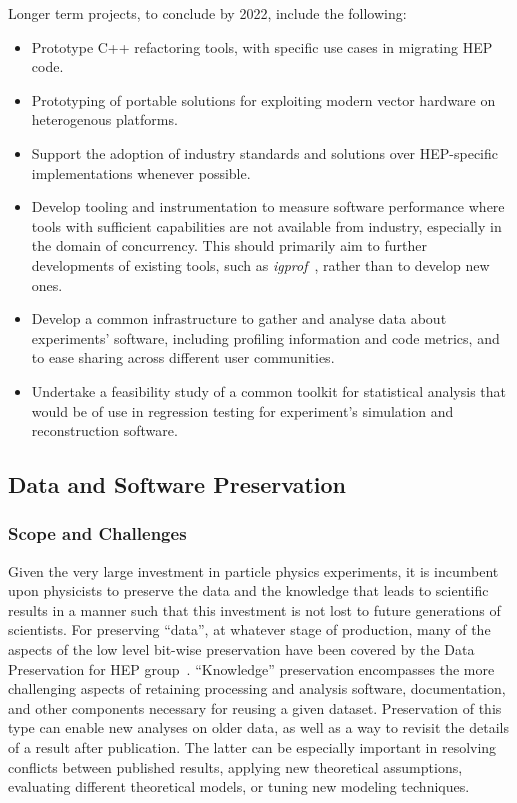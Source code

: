 Longer term projects, to conclude by 2022, include the following:

\begin{itemize}
\item
  Prototype C++ refactoring tools, with specific use cases in migrating
  HEP code.
\item
  Prototyping of portable solutions for exploiting modern vector
  hardware on heterogenous platforms.
\item
  Support the adoption of industry standards and solutions over
  HEP-specific implementations whenever possible.
\item
  Develop tooling and instrumentation to measure software performance
  where tools with sufficient capabilities are not available from
  industry, especially in the domain of concurrency. This should
  primarily aim to further developments of existing tools, such as
  \emph{igprof}~\cite{Eulisse:2005zz},
  rather than to develop new ones.
\item
  Develop a common infrastructure to gather and analyse data about
  experiments' software, including profiling information and code
  metrics, and to ease sharing across different user communities.
\item
  Undertake a feasibility study of a common toolkit for statistical
  analysis that would be of use in regression testing for experiment's
  simulation and reconstruction software.
\end{itemize}


\hypertarget{data-and-software-preservation}{%
\subsection{Data and Software
Preservation}\label{data-and-software-preservation}}

\subsubsection*{Scope and Challenges}

Given the very large investment in particle physics experiments, it is
incumbent upon physicists to preserve the data and the knowledge that
leads to scientific results in a manner such that this investment is not
lost to future generations of scientists. For preserving ``data'', at
whatever stage of production, many of the aspects of the low level
bit-wise preservation have been covered by the Data Preservation for HEP
group~\cite{DPHEP}. ``Knowledge'' preservation encompasses the more
challenging aspects of retaining processing and analysis software,
documentation, and other components necessary for reusing a given
dataset. Preservation of this type can enable new analyses on older
data, as well as a way to revisit the details of a result after
publication. The latter can be especially important in resolving
conflicts between published results, applying new theoretical
assumptions, evaluating different theoretical models, or tuning new
modeling techniques.


